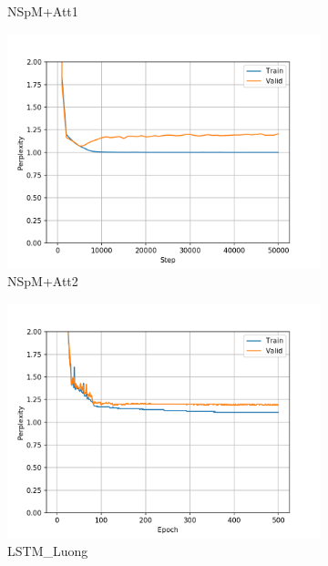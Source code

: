 \begin{figure}[H]
\begin{subfigure}{0.45\textwidth}
\caption{NSpM+Att1}
\label{fig:monu600 nsmbah ppl}
\end{subfigure}
\hfill
\begin{subfigure}{0.45\textwidth}
\includegraphics[width=\textwidth]{../results/monument_600/run1/neural_sparql_machine_luong_attention/ppls.png} 
\caption{NSpM+Att2}
\label{fig:monu600 nsmluo ppl}
\end{subfigure}
\hfill
\begin{subfigure}{0.45\textwidth}
\includegraphics[width=\textwidth]{../results/monument_600/run1/lstm_luong_wmt_en_de/ppls.png}
\caption{LSTM\_Luong}
\label{fig:monu600 lstm ppl}
\end{subfigure}
\hfill
\begin{subfigure}{0.45\textwidth}

\end{subfigure}
\end{figure}
